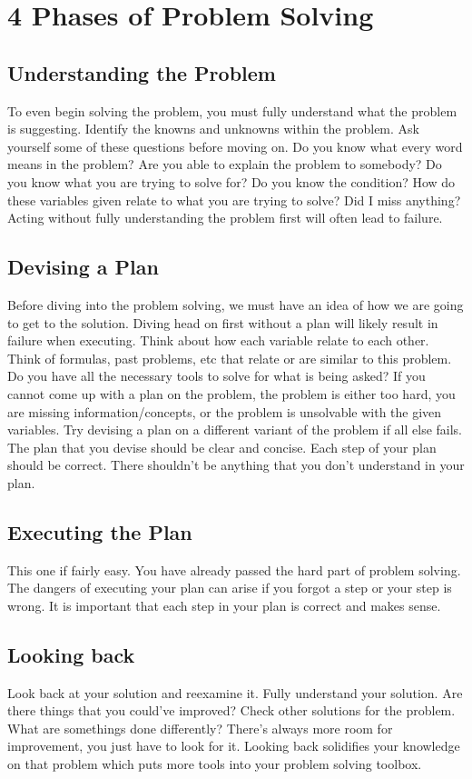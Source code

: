 \documentclass[12pt]{article}
\begin{document}
\section{4 Phases of Problem Solving}
\subsection{Understanding the Problem}
To even begin solving the problem, you must fully understand
what the problem is suggesting. Identify the knowns and unknowns
within the problem. Ask yourself some of these questions before moving on.
Do you know what every word means in the problem? Are you able to explain
the problem to somebody? Do you know what you are trying to solve for? Do you know the condition? How do 
these variables given relate to what you are trying to solve? Did I miss anything?
Acting without fully understanding the problem first will often lead to failure.

\subsection{Devising a Plan}
Before diving into the problem solving, we must have an idea of 
how we are going to get to the solution. Diving head on first without a plan will likely result in failure when executing.
Think about how each variable relate to each other. Think of formulas, past problems, etc that relate or 
are similar to this problem. Do you have all the necessary tools to solve for what is being asked?
If you cannot come up with a plan on the problem, the problem is either too hard, you are missing information/concepts, or the problem is unsolvable 
with the given variables. Try devising a plan on a different variant of the problem if all else fails. 
The plan that you devise should be clear and concise. Each step of your plan should be correct.
There shouldn't be anything that you don't understand in your plan.

\subsection{Executing the Plan}
This one if fairly easy. You have already passed the hard part of problem solving.
The dangers of executing your plan can arise if you forgot a step or your step is wrong.
It is important that each step in your plan is correct and makes sense.

\subsection{Looking back}
Look back at your solution and reexamine it. Fully understand 
your solution. Are there things that you could've improved? Check
other solutions for the problem. What are somethings done differently?
There's always more room for improvement, you just have to look for it.
Looking back solidifies your knowledge on that problem which puts more tools into your problem solving toolbox.
\end{document}

